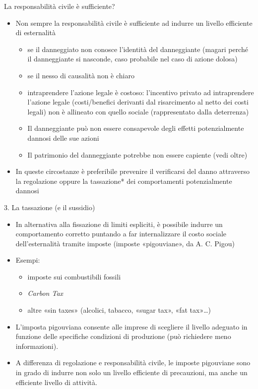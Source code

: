 \documentclass[aspectratio=64,11pt]{beamer}
\begin{document}
\begin{frame}{La responsabilità civile è sufficiente?}
\begin{itemize}
\item Non sempre la responsabilità civile è sufficiente ad indurre un livello
efficiente di esternalità
\begin{itemize}
\item se il danneggiato non conosce l'identità del danneggiante (magari perché il
danneggiante si nasconde, caso probabile nel caso di azione dolosa)
\item se il nesso di causalità non è chiaro
\item intraprendere l'azione legale è costoso: l'incentivo privato ad
intraprendere l'azione legale (costi/benefici derivanti dal risarcimento al
netto dei costi legali) non è allineato con quello sociale (rappresentato
dalla deterrenza)
\item Il danneggiante può non essere consapevole degli effetti potenzialmente
dannosi delle sue azioni
\item Il patrimonio del danneggiante potrebbe non essere capiente (vedi oltre)
\end{itemize}
\item In queste circostanze è preferibile \alert{prevenire} il verificarsi del danno
attraverso la regolazione oppure la tassazione* dei comportamenti
potenzialmente dannosi
\end{itemize}
\end{frame}

\begin{frame}{3. La tassazione (e il sussidio)}
\begin{itemize}
\item In alternativa alla fissazione di limiti espliciti, è possibile indurre un
comportamento corretto puntando a far internalizzare il costo sociale
dell'esternalità tramite imposte (imposte «pigouviane», da A. C. Pigou)
\item Esempi:
\begin{itemize}
\item imposte sui combustibili fossili
\item \emph{Carbon Tax}
\item altre «sin taxes» (alcolici, tabacco, «sugar tax», «fat tax»\ldots{})
\end{itemize}
\item L'imposta pigouviana consente alle imprese di scegliere il livello adeguato
in funzione delle specifiche condizioni di produzione (può richiedere meno
informazioni).
\item A differenza di regolazione e responsabilità civile, le imposte pigouviane
sono in grado di indurre non solo un livello efficiente di precauzioni, ma
anche un efficiente \alert{livello di attività}.
\end{itemize}
\end{frame}
\end{document}
